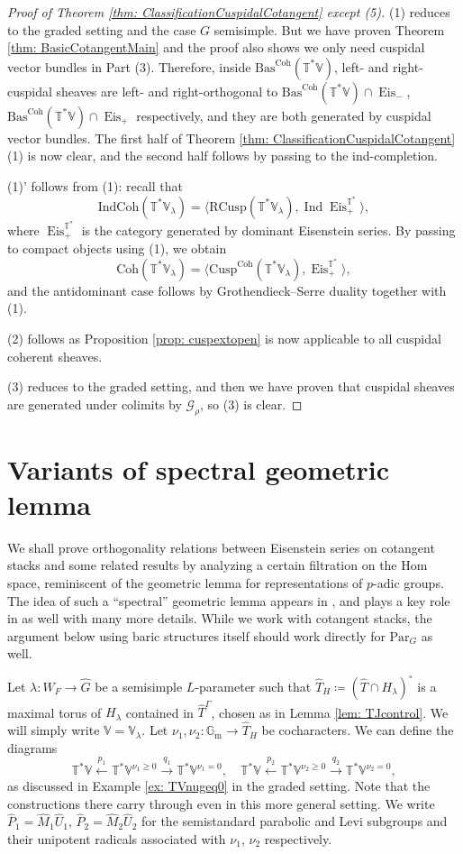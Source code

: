 \documentclass{amsart}
\theoremstyle{definition}
\theoremstyle{remark}
\numberwithin{equation}{section}
\DeclareMathOperator{\Ind}{Ind}
\newcommand{\mc}{\mathcal}
\newcommand{\Gm}{{\mathbb{G}_{\mathrm{m}}}}
\newcommand{\wh}{\widehat}
\newcommand{\Par}{\mathrm{Par}}
\newcommand{\IndCoh}{\mathrm{IndCoh}}
\DeclareMathOperator{\Eis}{\mathrm{Eis}}
\newcommand{\Coh}{\mathrm{Coh}}
\newcommand{\Cusp}{\mathrm{Cusp}}
\newcommand{\RCusp}{\mathrm{RCusp}}
\newcommand{\V}{\mathbb{V}}
\newcommand{\T}{\mathbb{T}}
\newcommand{\Bas}{\mathrm{Bas}}
\begin{document}
\begin{proof}[Proof of Theorem \ref{thm: ClassificationCuspidalCotangent} except (5)]
(1) reduces to the graded setting and the case $G$ semisimple. But we have proven Theorem \ref{thm: BasicCotangentMain} and the proof also shows we only need cuspidal vector bundles in Part (3). Therefore, inside $\Bas^\Coh(\T^*\V)$, left- and right-cuspidal sheaves are left- and right-orthogonal to $\Bas^\Coh(\T^*\V) \cap \Eis_-$, $\Bas^\Coh(\T^*\V) \cap \Eis_+$ respectively, and they are both generated by cuspidal vector bundles. The first half of Theorem \ref{thm: ClassificationCuspidalCotangent} (1) is now clear, and the second half follows by passing to the ind-completion. 

(1)' follows from (1): recall that
\[
\IndCoh(\T^*\V_\lambda)=\langle \RCusp (\T^*\V_\lambda), \Ind \Eis_+^{\T^*} \rangle,
\]
where $\Eis_+^{\T^*}$ is the category generated by dominant Eisenstein series. By passing to compact objects using (1), we obtain
\[
\Coh(\T^*\V_\lambda)=\langle \Cusp^\Coh (\T^*\V_\lambda), \Eis_+^{\T^*} \rangle,
\]
and the antidominant case follows by Grothendieck--Serre duality together with (1). 

(2) follows as Proposition \ref{prop: cuspextopen} is now applicable to all cuspidal coherent sheaves. 

(3) reduces to the graded setting, and then we have proven that cuspidal sheaves are generated under colimits by $\mc G_\rho$, so (3) is clear. 
\end{proof}

\section{Variants of spectral geometric lemma}{\label{s: spectralgeometriclemma}}

We shall prove orthogonality relations between Eisenstein series on cotangent stacks and some related results by analyzing a certain filtration on the Hom space, reminiscent of the geometric lemma for representations of $p$-adic groups. The idea of such a ``spectral'' geometric lemma appears in \cite{GLCIII}, and plays a key role in \cite{HansenMann} as well with many more details. While we work with cotangent stacks, the argument below using baric structures itself should work directly for $\Par_G$ as well.

Let $\lambda\colon W_F\to \wh G$ be a semisimple $L$-parameter such that $\wh T_H\coloneq (\wh T\cap H_\lambda)^\circ$ is a maximal torus of $H_\lambda$ contained in $\wh T^\Gamma$, chosen as in Lemma \ref{lem: TJcontrol}. We will simply write $\V=\V_\lambda$. Let $\nu_1, \nu_2\colon \Gm\to \wh T_H$ be cocharacters. We can define the diagrams
\[
\T^* \V \xleftarrow{p_1} \T^* \V^{\nu_1\geq 0} \xrightarrow{q_1} \T^*\V^{\nu_1=0}, \quad
\T^* \V \xleftarrow{p_2} \T^* \V^{\nu_2\geq 0} \xrightarrow{q_2} \T^*\V^{\nu_2=0},
\]
as discussed in Example \ref{ex: TVnugeq0} in the graded setting. Note that the constructions there carry through even in this more general setting.  We write $\wh P_1 =\wh M_1 \wh U_1$, $\wh P_2 = \wh M_2 \wh U_2$ for the semistandard parabolic and Levi subgroups and their unipotent radicals associated with $\nu_1$, $\nu_2$ respectively. 
\end{document}
